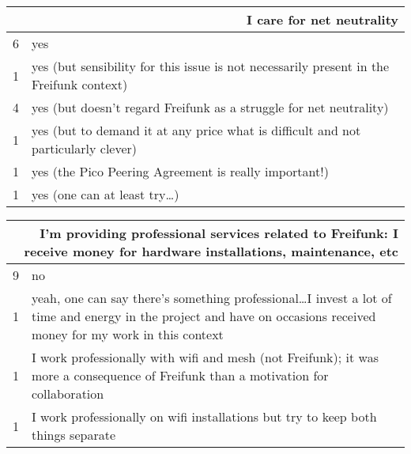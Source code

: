 \begin{table}[h]
  \begin{tabular}{| r | p{\textwidth} |}
    \hline
    \multicolumn{2}{|p{\textwidth}|}{I care for net neutrality} \\
    \hline
    6 & yes \\
    1 & yes (but sensibility for this issue is not necessarily present in the Freifunk context) \\
    4 & yes (but doesn't regard Freifunk as a struggle for net neutrality) \\
    1 & yes (but to demand it at any price what is difficult and not particularly clever) \\
    1 & yes (the Pico Peering Agreement is really important!) \\
    1 & yes (one can at least try\ldots) \\
    \hline
  \end{tabular}
\end{table}

\begin{table}[h]
  \begin{tabular}{| r | p{\textwidth} |}
    \hline
    \multicolumn{2}{|p{\textwidth}|}{I'm providing professional services related to Freifunk: I receive money for hardware installations, maintenance, etc} \\
    \hline
    9 & no \\
    1 & yeah, one can say there's something professional\ldots I invest a lot of time and energy in the project and have on occasions received money for my work in this context \\
    1 & I work professionally with wifi and mesh (not Freifunk); it was more a consequence of Freifunk than a motivation for collaboration \\
    1 & I work professionally on wifi installations but try to keep both things separate \\
    \hline
  \end{tabular}
\end{table}

